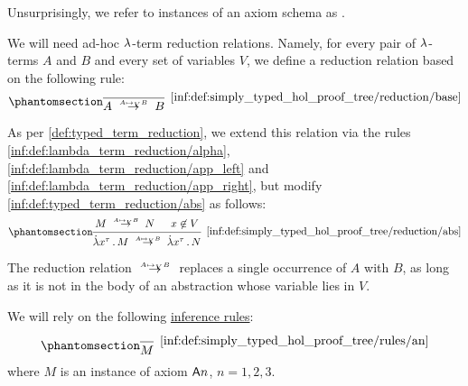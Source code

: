 \begin{definition}
\begin{thmenum}[series=def:simply_typed_hol_proof_tree]
    Unsurprisingly, we refer to instances of an axiom schema as .

     We will need ad-hoc \( {\mathrm \lambda} \)-term reduction relations. Namely, for every pair of \( {\mathrm \lambda} \)-terms \( A \) and \( B \) and every set of variables \( V \), we define a reduction relation based on the following rule:
    \begin{equation*}\taglabel[\ensuremath{ \logic{Red}_{A \mapsto_V B} }]{inf:def:simply_typed_hol_proof_tree/reduction/base}
      \begin{prooftree}
        \infer0[\ref{inf:def:simply_typed_hol_proof_tree/reduction/base}]{ A \redrel{A \mapsto_V B} B }.
      \end{prooftree}
    \end{equation*}

    As per \cref{def:typed_term_reduction}, we extend this relation via the rules \ref{inf:def:lambda_term_reduction/alpha}, \ref{inf:def:lambda_term_reduction/app_left} and \ref{inf:def:lambda_term_reduction/app_right}, but modify \ref{inf:def:typed_term_reduction/abs} as follows:
    \begin{equation*}\taglabel[\ensuremath{ \logic{Abs}_{A \mapsto_V B} }]{inf:def:simply_typed_hol_proof_tree/reduction/abs}
      \begin{prooftree}
        \hypo{ M \redrel{A \mapsto_V B} N }
        \hypo{ x \not\in V }
        \infer2[\ref{inf:def:simply_typed_hol_proof_tree/reduction/abs}]{ \qabs {x^\tau} M \redrel{A \mapsto_V B} \qabs {x^\tau} N }.
      \end{prooftree}
    \end{equation*}

    The reduction relation \( {\redrel{A \mapsto_V B}} \) replaces a single occurrence of \( A \) with \( B \), as long as it is not in the body of an abstraction whose variable lies in \( V \).

     We will rely on the following \hyperref[def:inference_rule]{inference rules}:
    \begin{paracol}{3}
      \begin{nthcolumn}{0}
        \ParacolAlignmentHack
        \begin{equation*}\taglabel[\ensuremath{ \logic{A}_n }]{inf:def:simply_typed_hol_proof_tree/rules/an}
          \begin{prooftree}
            \infer0[\ref{inf:def:simply_typed_hol_proof_tree/rules/an}]{ M },
          \end{prooftree}
        \end{equation*}
        where \( M \) is an instance of axiom \( \textsf{A}n \), \( n = 1, 2, 3 \).
      \end{nthcolumn}


\end{paracol}
\end{thmenum}
\end{definition}
